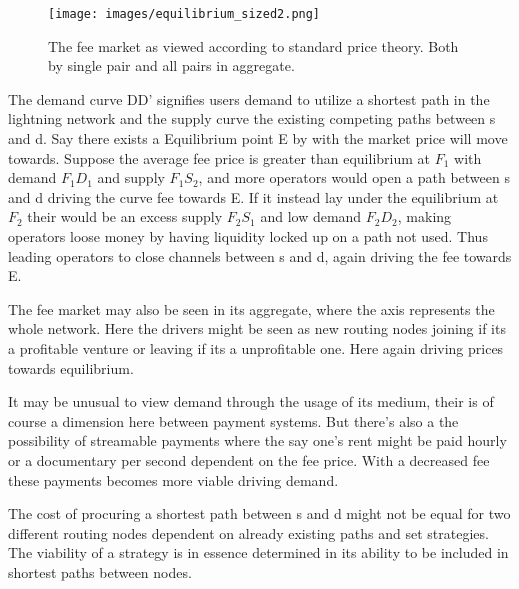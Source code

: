 \begin{figure}[!htb]
	\hspace*{-0.3cm} 
	\centering
	\texttt{[image: images/equilibrium\_sized2.png]}
	\caption{ The fee market as viewed according to standard price theory. Both by single pair and all pairs in aggregate. 
		}
		\label{fig:equilibrium}
		\hspace*{2mm} 	
\end{figure}

The demand curve DD' signifies users demand to utilize a shortest path in the lightning network and the supply curve the existing competing paths between s and d. Say there exists a Equilibrium point E by with the market price will move towards. Suppose the average fee price is greater than equilibrium at $F_{1}$ with demand $F_{1}D_{1}$ and supply $F_{1}S_{2}$, and more operators would open a path between s and d driving the curve fee towards E. If it instead lay under the equilibrium at $F_2$ their would be an excess supply $F_{2}S_{1}$ and low demand $F_{2}D_{2}$, making operators loose money by having liquidity locked up on a path not used. Thus leading operators to close channels between s and d, again driving the fee towards E.

The fee market may also be seen in its aggregate, where the axis represents the whole network. Here the drivers might be seen as new routing nodes joining if its a profitable venture or leaving if its a unprofitable one. Here again driving prices towards equilibrium. 

It may be unusual to view demand through the usage of its medium, their is of course a dimension here between payment systems. But there's also a the possibility of streamable payments where the say one's rent might be paid hourly or a documentary per second dependent on the fee price. With a decreased fee these payments becomes more viable driving demand.

The cost of procuring a shortest path between s and d might not be equal for two different routing nodes dependent on already existing paths and set strategies. The viability of a strategy is in essence determined in its ability to be included in shortest paths between nodes.

\newpage
\onecolumn


